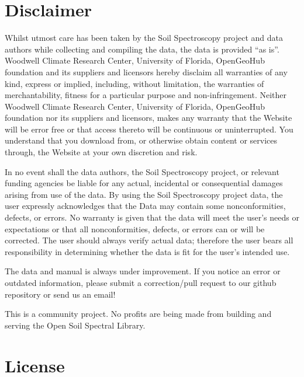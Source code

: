\documentclass[
  letterpaper,
  DIV=11,
  numbers=noendperiod]{scrreprt}
\begin{document}
\section*{Disclaimer}\label{disclaimer}


Whilst utmost care has been taken by the Soil Spectroscopy project and
data authors while collecting and compiling the data, the data is
provided ``as is''. Woodwell Climate Research Center, University of
Florida, OpenGeoHub foundation and its suppliers and licensors hereby
disclaim all warranties of any kind, express or implied, including,
without limitation, the warranties of merchantability, fitness for a
particular purpose and non-infringement. Neither Woodwell Climate
Research Center, University of Florida, OpenGeoHub foundation nor its
suppliers and licensors, makes any warranty that the Website will be
error free or that access thereto will be continuous or uninterrupted.
You understand that you download from, or otherwise obtain content or
services through, the Website at your own discretion and risk.

In no event shall the data authors, the Soil Spectroscopy project, or
relevant funding agencies be liable for any actual, incidental or
consequential damages arising from use of the data. By using the Soil
Spectroscopy project data, the user expressly acknowledges that the Data
may contain some nonconformities, defects, or errors. No warranty is
given that the data will meet the user's needs or expectations or that
all nonconformities, defects, or errors can or will be corrected. The
user should always verify actual data; therefore the user bears all
responsibility in determining whether the data is fit for the user's
intended use.

The data and manual is always under improvement. If you notice an error
or outdated information, please submit a correction/pull request to our
github repository or send us an email!

This is a community project. No profits are being made from building and
serving the Open Soil Spectral Library.

\section*{License}\label{license}

\end{document}
